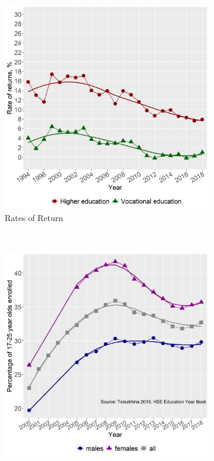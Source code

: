 \documentclass[alpha-refs]{wiley-article-01g}
\begin{document}
\begin{figure}[htbp!]
\caption{\textbf{Rates of Returns to Higher and Vocational Education in Russia, RLMS 1994-2018}}\label{fig:1.3}
         \centering
         \begin{subfigure}[b]{0.5\textwidth}
                 \includegraphics[width=\textwidth]{re_HE_all.png}
                 \caption{Rates of Return}
                 \label{fig:1.3a}
         \end{subfigure}%
         ~ %
         \begin{subfigure}[b]{0.5\textwidth}
                 \includegraphics[width=\textwidth]{telez1a.png}

\end{subfigure}
\end{figure}
\end{document}
